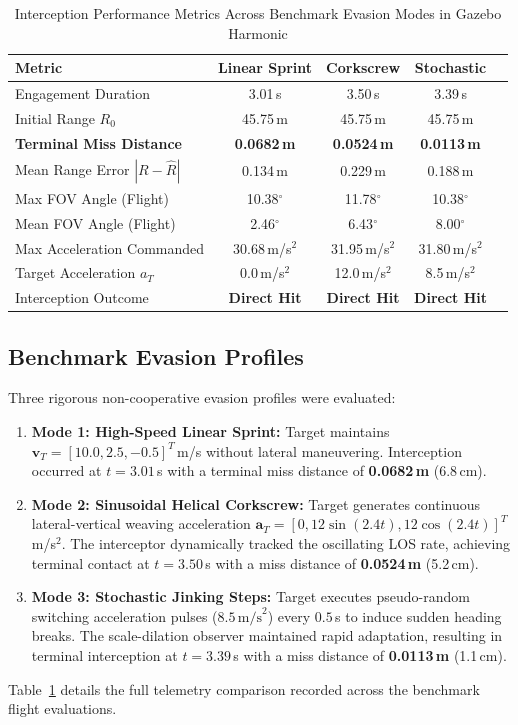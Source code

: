 \documentclass[lettersize,journal]{IEEEtran}
\begin{document}
\begin{table}[!t]
\renewcommand{\arraystretch}{1.2}
\caption{Interception Performance Metrics Across Benchmark Evasion Modes in Gazebo Harmonic}
\label{tab:metrics}
\centering
\begin{tabular}{@{}lcccc@{}}
\toprule
\textbf{Metric} & \textbf{Linear Sprint} & \textbf{Corkscrew} & \textbf{Stochastic} \\ \midrule
Engagement Duration & 3.01\,s & 3.50\,s & 3.39\,s \\
Initial Range $R_0$ & 45.75\,m & 45.75\,m & 45.75\,m \\
\textbf{Terminal Miss Distance} & \textbf{0.0682\,m} & \textbf{0.0524\,m} & \textbf{0.0113\,m} \\
Mean Range Error $|R - \hat{R}|$ & 0.134\,m & 0.229\,m & 0.188\,m \\
Max FOV Angle (Flight) & 10.38$^\circ$ & 11.78$^\circ$ & 10.38$^\circ$ \\
Mean FOV Angle (Flight) & 2.46$^\circ$ & 6.43$^\circ$ & 8.00$^\circ$ \\
Max Acceleration Commanded & 30.68\,m/s$^2$ & 31.95\,m/s$^2$ & 31.80\,m/s$^2$ \\
Target Acceleration $a_T$ & 0.0\,m/s$^2$ & 12.0\,m/s$^2$ & 8.5\,m/s$^2$ \\
Interception Outcome & \textbf{Direct Hit} & \textbf{Direct Hit} & \textbf{Direct Hit} \\ \bottomrule
\end{tabular}
\end{table}

\subsection{Benchmark Evasion Profiles}
Three rigorous non-cooperative evasion profiles were evaluated:
\begin{enumerate}
    \item \textbf{Mode 1: High-Speed Linear Sprint:} Target maintains $\mathbf{v}_T = [10.0, 2.5, -0.5]^T$\,m/s without lateral maneuvering. Interception occurred at $t = 3.01$\,s with a terminal miss distance of \textbf{0.0682\,m} (6.8\,cm).
    \item \textbf{Mode 2: Sinusoidal Helical Corkscrew:} Target generates continuous lateral-vertical weaving acceleration $\mathbf{a}_T = [0, 12 \sin(2.4 t), 12 \cos(2.4 t)]^T$\,m/s$^2$. The interceptor dynamically tracked the oscillating LOS rate, achieving terminal contact at $t = 3.50$\,s with a miss distance of \textbf{0.0524\,m} (5.2\,cm).
    \item \textbf{Mode 3: Stochastic Jinking Steps:} Target executes pseudo-random switching acceleration pulses ($8.5\,\text{m/s}^2$) every $0.5$\,s to induce sudden heading breaks. The scale-dilation observer maintained rapid adaptation, resulting in terminal interception at $t = 3.39$\,s with a miss distance of \textbf{0.0113\,m} (1.1\,cm).
\end{enumerate}
Table~\ref{tab:metrics} details the full telemetry comparison recorded across the benchmark flight evaluations.
\end{document}
